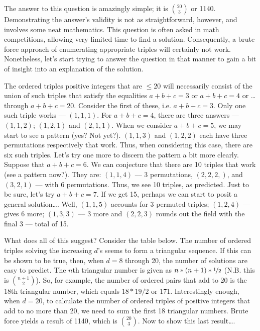 
The answer to this question is amazingly simple; it is \(\binom{20}{3}\) or 1140. Demonstrating the answer’s validity is not as straightforward, however, and involves some neat mathematics. This question is often asked in math competitions, allowing very limited time to find a solution. Consequently, a brute force approach of enumerating appropriate triples will certainly not work. Nonetheless, let’s start trying to answer the question in that manner to gain a bit of insight into an explanation of the solution.

The ordered triples positive integers that are \(\leq 20\) will necessarily consist of the union of such triples that satisfy the equalities \(a + b + c = 3\) or \(a + b + c = 4\) or \ldots through \(a + b + c = 20\). Consider the first of these, i.e. \(a + b + c = 3\). Only one such triple works --- \((1,1,1)\).  For \(a + b + c = 4\), there are three answers --- \((1,1,2)\); \((1,2,1)\) and \((2,1,1)\). When we consider \(a + b + c = 5\), we may start to see a pattern (yes? Not yet?). \((1,1,3)\) and \((1,2,2)\) each have three permutations respectively that work. Thus, when considering this case, there are six such triples. Let’s try one more to discern the pattern a bit more clearly. Suppose that \(a + b + c = 6\). We can conjecture that there are 10 triples that work (see a pattern now?). They are: \((1,1,4)\) –-- 3 permutations, \((2,2,2,)\), and \((3,2,1)\) --– with 6 permutations. Thus, we see 10 triples, as predicted. Just to be sure, let’s try \(a + b + c = 7\). If we get 15, perhaps we can start to posit a general solution\ldots. Well, \((1,1,5)\) accounts for 3 permuted triples; \((1,2,4)\) –-- gives 6 more; \((1,3,3)\) --– 3 more and \((2,2,3)\) rounds out the field with the final 3 --– total of 15.

What does all of this suggest? Consider the table below. The number of ordered triples solving the increasing \(d\)’s seems to form a triangular sequence. If this can be shown to be true, then, when \(d = 8\) through 20, the number of solutions are easy to predict. The \(n\)th triangular number is given as \(n * (n+1) * \nicefrac{1}{2}\) (N.B. this is \(\binom{n+1}{2}\)). So, for example, the number of ordered pairs that add to 20 is the 18th triangular number, which equals \(18 * 19 / 2\) or 171. Interestingly enough, when \(d = 20\), to calculate the number of ordered triples of positive integers that add to no more than 20, we need to sum the first 18 triangular numbers. Brute force yields a result of 1140, which is \(\binom{20}{3}\). Now to show this last result\ldots.

